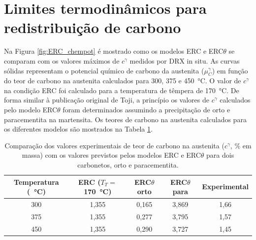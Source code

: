 
\section{Limites termodinâmicos para redistribuição de carbono}

\label{sec:termodinamica_particao}


Na Figura \ref{fig:ERC_chempot} é mostrado como os modelos ERC e ERC$\theta$ se comparam com os valores máximos de $c^\gamma$ medidos por DRX in situ. As curvas sólidas representam o potencial químico de carbono da austenita ($\mu_C^\gamma$) em função do teor de carbono na austenita calculados para 300, 375 e \SI{450}{\degreeCelsius}. O valor de $c^\gamma$ na condição ERC foi calculado para a temperatura de têmpera de \SI{170}{\degreeCelsius}. De forma similar à publicação original de Toji\cite{Toji2015}, a princípio os valores de $c^\gamma$ calculados pelo modelo ERC$\theta$ foram determinados assumindo a precipitação de orto e paracementita na martensita. Os teores de carbono na austenita calculados para os diferentes modelos são mostrados na Tabela \ref{tab:ERCtheta}.

\begin{table}
  \centering
  \caption{Comparação dos valores experimentais de teor de carbono na austenita ($c^\gamma$, \% em massa) com os valores previstos pelos modelos ERC e ERC$\theta$ para dois carbonetos, orto e paracementita.}
  \begin{tabular}{ccccc}
    \hline
      Temperatura (\SI{}{\degreeCelsius}) & ERC ($T_T=$\SI{170}{\degreeCelsius}) & ERC$\theta$ orto & ERC$\theta$ para & Experimental \\
    \hline
      300 & 1,355 & 0,165 & 3,869 & 1,66 \\
      375 & 1,355 & 0,277 & 3,795 & 1,57 \\
      450 & 1,355 & 0,290 & 3,727 & 1,45 \\
    \hline
  \end{tabular}
  \label{tab:ERCtheta}
\end{table}

